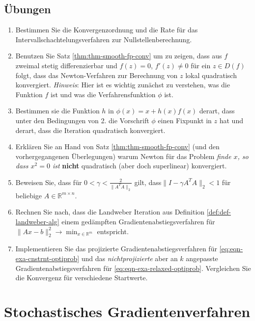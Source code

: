 \documentclass[
]{book}
\theoremstyle{definition}
\theoremstyle{definition}
\theoremstyle{definition}
\theoremstyle{definition}
\theoremstyle{remark}
\begin{document}
\hypertarget{uxfcbungen-2}{%
\section{Übungen}\label{uxfcbungen-2}}

\begin{enumerate}
\def\labelenumi{\arabic{enumi}.}
\item
  Bestimmen Sie die Konvergenzordnung und die Rate für das Intervallschachtelungsverfahren zur Nullstellenberechnung.
\item
  Benutzen Sie Satz \ref{thm:thm-smooth-fp-conv} um zu zeigen, dass aus \(f\) zweimal stetig differenzierbar und \(f(z)=0\), \(f'(z)\neq 0\) für ein \(z\in D(f)\) folgt, dass das Newton-Verfahren zur Berechnung von \(z\) lokal quadratisch konvergiert. \emph{Hinweis}: Hier ist es wichtig zunächst zu verstehen, was die Funktion \(f\) ist und was die Verfahrensfunktion \(\phi\) ist.
\item
  Bestimmen sie die Funktion \(h\) in \(\phi(x) = x+h(x)f(x)\) derart, dass unter den Bedingungen von 2. die Vorschrift \(\phi\) einen Fixpunkt in \(z\) hat und derart, dass die Iteration quadratisch konvergiert.
\item
  Erklären Sie an Hand von Satz \ref{thm:thm-smooth-fp-conv} (und den vorhergegangenen Überlegungen) warum Newton für das Problem \emph{finde \(x\), so dass \(x^2=0\) ist} \textbf{nicht} quadratisch (aber doch superlinear) konvergiert.
\item
  Beweisen Sie, dass für \(0<\gamma< \frac{2}{\|A^TA\|_2}\) gilt, dass\(\|I-\gamma A^TA\|_2<1\) für beliebige \(A\in \mathbb R^{m \times n}\).
\item
  Rechnen Sie nach, dass die Landweber Iteration aus Definition \ref{def:def-landweber-alg} einem gedämpften Gradientenabstiegsverfahren für \(\|Ax-b\|_2^2 \to \min_{x\in \mathbb R^{m}}\) entspricht.
\item
  Implementieren Sie das projizierte Gradientenabstiegsverfahren für \eqref{eq:eqn-exa-cnstrnt-optiprob} und das \emph{nichtprojizierte} aber an \(k\) angepasste Gradientenabstiegsverfahren für \eqref{eq:eqn-exa-relaxed-optiprob}. Vergleichen Sie die Konvergenz für verschiedene Startwerte.
\end{enumerate}

\hypertarget{stochastisches-gradientenverfahren}{%
\chapter{Stochastisches Gradientenverfahren}\label{stochastisches-gradientenverfahren}}
\end{document}
